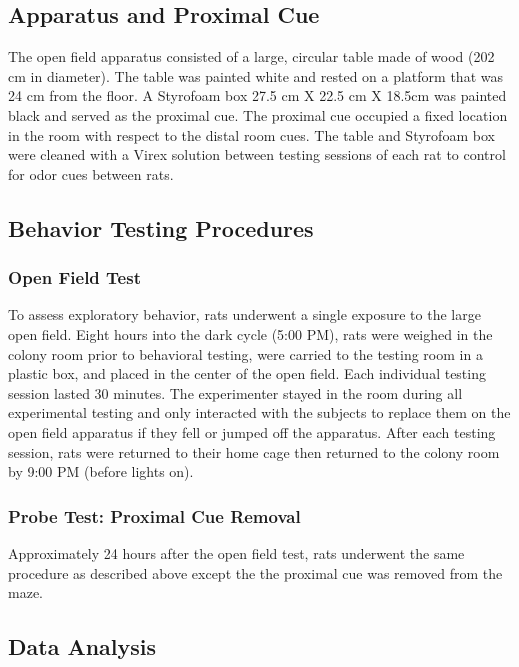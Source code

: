 \documentclass[fleqn,10pt]{wlscirep}
\begin{document}
\subsection*{Apparatus and Proximal Cue}
The open field apparatus consisted of a large, circular table made of wood (202 cm in diameter). The table was painted white and rested on a platform that was 24 cm from the floor. A Styrofoam box 27.5 cm X 22.5 cm X 18.5cm was painted black and served as the proximal cue. The proximal cue occupied a fixed location in the room with respect to the distal room cues. The table and Styrofoam box were cleaned with a Virex solution between testing sessions of each rat to control for odor cues between rats. 

\subsection*{Behavior Testing Procedures}

\subsubsection*{Open Field Test} To assess exploratory behavior, rats underwent a single exposure to the large open field. Eight hours into the dark cycle (5:00 PM), rats were weighed in the colony room prior to behavioral testing, were carried to the testing room in a plastic box, and placed in the center of the open field. Each individual testing session lasted 30 minutes. The experimenter stayed in the room during all experimental testing and only interacted with the subjects to replace them on the open field apparatus if they fell or jumped off the apparatus. After each testing session, rats were returned to their home cage then returned to the colony room by 9:00 PM (before lights on).

\subsubsection*{Probe Test: Proximal Cue Removal} Approximately 24 hours after the open field test, rats underwent the same procedure as described above except the the proximal cue was removed from the maze.  


\subsection*{Data Analysis}
\end{document}
